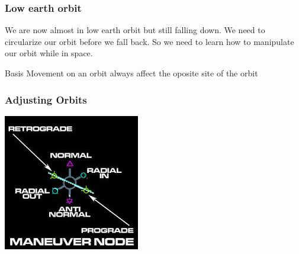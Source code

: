 {
%
\begin{frame}
\end{frame}
\begin{frame}
    \frametitle{Low earth orbit}
    \begin{block}{}
        We are now almost in low earth orbit but still falling down. We need to circularize our orbit before we fall
        back. So we need to learn how to manipulate our orbit while in space.
        \begin{block}{Basis}
            Movement on an orbit always affect the oposite site of the orbit
        \end{block}
    \end{block}
\end{frame}
\begin{frame}
    \frametitle{Adjusting Orbits}
    \begin{block}{}
        \begin{center}
            \includegraphics[scale=0.8]{images/maneuver_node.jpg}

\end{center}
\end{block}
\end{frame}}

